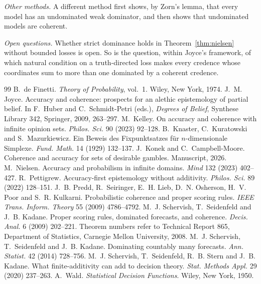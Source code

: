 \documentclass[11pt]{article}
\theoremstyle{definition}
\theoremstyle{remark}
\begin{document}
\emph{Other methods.} A different method first shows, by Zorn's lemma, that every model has an undominated weak dominator, and then shows that undominated models are coherent.

\emph{Open questions.} Whether strict dominance holds in Theorem~\ref{thm:nielsen} without bounded losses is open. So is the question, within Joyce's framework, of which natural condition on a truth-directed loss makes every credence whose coordinates sum to more than one dominated by a coherent credence.

\begin{thebibliography}{99}
 B.~de Finetti. \emph{Theory of Probability}, vol.~1. Wiley, New York, 1974.
 J.~M. Joyce. Accuracy and coherence: prospects for an alethic epistemology of partial belief. In F.~Huber and C.~Schmidt-Petri (eds.), \emph{Degrees of Belief}, Synthese Library 342, Springer, 2009, 263--297.
 M.~Kelley. On accuracy and coherence with infinite opinion sets. \emph{Philos. Sci.} 90 (2023) 92--128.
 B.~Knaster, C.~Kuratowski and S.~Mazurkiewicz. Ein Beweis des Fixpunktsatzes f\"ur $n$-dimensionale Simplexe. \emph{Fund. Math.} 14 (1929) 132--137.
 J.~Konek and C.~Campbell-Moore. Coherence and accuracy for sets of desirable gambles. Manuscript, 2026.
 M.~Nielsen. Accuracy and probabilism in infinite domains. \emph{Mind} 132 (2023) 402--427.
 R.~Pettigrew. Accuracy-first epistemology without additivity. \emph{Philos. Sci.} 89 (2022) 128--151.
 J.~B. Predd, R.~Seiringer, E.~H. Lieb, D.~N. Osherson, H.~V. Poor and S.~R. Kulkarni. Probabilistic coherence and proper scoring rules. \emph{IEEE Trans. Inform. Theory} 55 (2009) 4786--4792.
 M.~J. Schervish, T.~Seidenfeld and J.~B. Kadane. Proper scoring rules, dominated forecasts, and coherence. \emph{Decis. Anal.} 6 (2009) 202--221. Theorem numbers refer to Technical Report 865, Department of Statistics, Carnegie Mellon University, 2008.
 M.~J. Schervish, T.~Seidenfeld and J.~B. Kadane. Dominating countably many forecasts. \emph{Ann. Statist.} 42 (2014) 728--756.
 M.~J. Schervish, T.~Seidenfeld, R.~B. Stern and J.~B. Kadane. What finite-additivity can add to decision theory. \emph{Stat. Methods Appl.} 29 (2020) 237--263.
 A.~Wald. \emph{Statistical Decision Functions}. Wiley, New York, 1950.
\end{thebibliography}
\end{document}

